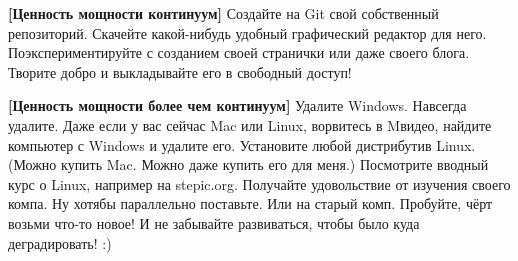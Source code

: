 \documentclass[12pt, a4paper, oneside]{article}
\begin{document}
\textbf{[Ценность мощности континуум]}  Создайте на Git свой собственный репозиторий. Скачейте какой-нибудь удобный графический редактор для него. Поэкспериментируйте с созданием своей странички или даже своего блога. Творите добро и выкладывайте его в свободный доступ!

\textbf{[Ценность мощности более чем континуум]} Удалите Windows. Навсегда удалите. Даже если у вас сейчас Mac или Linux, ворвитесь в Mвидео, найдите компьютер с Windows и удалите его. Установите любой дистрибутив Linux. (Можно купить Mac. Можно даже купить его для меня.) Посмотрите вводный курс о Linux, например на stepic.org. Получайте удовольствие от изучения своего компа. Ну хотябы параллельно поставьте. Или на старый комп. Пробуйте, чёрт возьми что-то новое! И не забывайте развиваться, чтобы было куда деградировать! :) 
\end{document}
